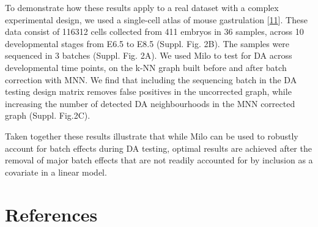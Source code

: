 \documentclass[
]{article}
\begin{document}
To demonstrate how these results apply to a real dataset with a complex experimental design, we used a single-cell atlas of mouse gastrulation {[}\protect\hyperlink{ref-pijuan-salaSinglecellMolecularMap2019}{11}{]}. These data consist of 116312 cells collected from 411 embryos in 36 samples, across 10 developmental stages from E6.5 to E8.5 (Suppl. Fig. 2B). The samples were sequenced in 3 batches (Suppl. Fig. 2A). We used Milo to test for DA across developmental time points, on the k-NN graph built before and after batch correction with MNN. We find that including the sequencing batch in the DA testing design matrix removes false positives in the uncorrected graph, while increasing the number of detected DA neighbourhoods in the MNN corrected graph (Suppl. Fig.2C).

Taken together these results illustrate that while Milo can be used to robustly account for batch effects during DA testing, optimal results are achieved after the removal of major batch effects that are not readily accounted for by inclusion as a covariate in a linear model.

\hypertarget{references}{%
\section*{References}\label{references}}
\end{document}
